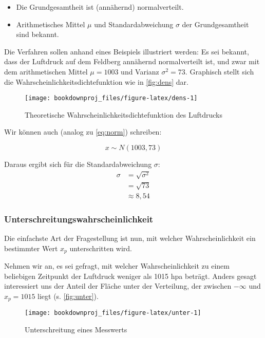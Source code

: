 \documentclass[
  ngerman,
]{article}
\providecommand{\tightlist}{%
  \setlength{\itemsep}{0pt}\setlength{\parskip}{0pt}}
\begin{document}
\begin{itemize}
\tightlist
\item
  Die Grundgesamtheit ist (annähernd) normalverteilt.
\item
  Arithmetisches Mittel \(\mu\) und Standardabweichung \(\sigma\) der Grundgesamtheit sind bekannt.
\end{itemize}

Die Verfahren sollen anhand eines Beispiels illustriert werden: Es sei bekannt, dass der Luftdruck auf dem Feldberg annähernd normalverteilt ist, und zwar mit dem arithmetischen Mittel \(\mu=1003\) und Varianz \(\sigma^2=73\). Graphisch stellt sich die Wahrscheinlichkeitsdichtefunktion wie in \autoref{fig:dens} dar.

\begin{figure}[t]

{\centering \texttt{[image: bookdownproj\_files/figure-latex/dens-1]} 

}

\caption{Theoretische Wahrscheinlichkeitsdichtefunktion des Luftdrucks}\label{fig:dens}
\end{figure}

Wir können auch (analog zu \autoref{eq:norm}) schreiben:

\[
x \sim N(1003, 73)
\]

Daraus ergibt sich für die Standardabweichung \(\sigma\):
\nopagebreak
\[\begin{aligned}
\sigma&=\sqrt{\sigma^2}\\
&=\sqrt{73}\\
&\approx8,54\end{aligned}\]

\hypertarget{unter}{%
\subsubsection{Unterschreitungswahrscheinlichkeit}\label{unter}}

Die einfachste Art der Fragestellung ist nun, mit welcher Wahrscheinlichkeit ein bestimmter Wert \(x_p\) unterschritten wird.

Nehmen wir an, es sei gefragt, mit welcher Wahrscheinlichkeit zu einem beliebigen Zeitpunkt der Luftdruck weniger als 1015 hpa beträgt. Anders gesagt interessiert uns der Anteil der Fläche unter der Verteilung, der zwischen \(-\infty\) und \(x_p=1015\) liegt (s. \autoref{fig:unter}).

\begin{figure}[H]

{\centering \texttt{[image: bookdownproj\_files/figure-latex/unter-1]} 

}

\caption{Unterschreitung eines Messwerts}\label{fig:unter}
\end{figure}
\end{document}
